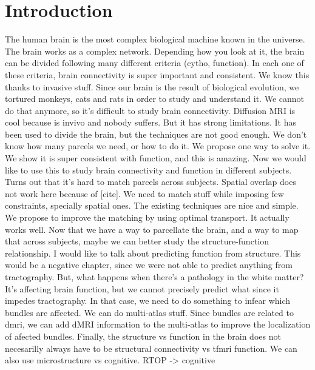 \chapter{Introduction}

The human brain is the most complex biological machine known in the universe.
The brain works as a complex network.
Depending how you look at it, the brain can be divided following many different criteria (cytho, function).
In each one of these criteria, brain connectivity is super important and consistent.
We know this thanks to invasive stuff.
Since our brain is the result of biological evolution, we tortured monkeys, cats and rats in order to study and understand it.
We cannot do that anymore, so it's difficult to study brain connectivity.
Diffusion MRI is cool because is invivo and nobody suffers.
But it has strong limitations.
It has been used to divide the brain, but the techniques are not good enough.
We don't know how many parcels we need, or how to do it.
We propose one way to solve it.
We show it is super consistent with function, and this is amazing.
Now we would like to use this to study brain connectivity and function in different subjects.
Turns out that it's hard to match parcels across subjects.
Spatial overlap does not work here because of [cite].
We need to match stuff while imposing few constraints, specially spatial ones.
The existing techniques are nice and simple.
We propose to improve the matching by using optimal transport.
It actually works well.
Now that we have a way to parcellate the brain, and a way to map that across subjects, maybe we can better study the structure-function relationship.
I would like to talk about predicting function from structure.
This would be a negative chapter, since we were not able to predict anything from tractography.
But, what happens when there's a pathology in the white matter?
It's affecting brain function, but we cannot precisely predict what since it impedes tractography.
In that case, we need to do something to infear which bundles are affected.
We can do multi-atlas stuff.
Since bundles are related to dmri, we can add dMRI information to the multi-atlas to improve the localization of afected bundles.
Finally, the structure vs function in the brain does not necesarilly always have to be structural connectivity vs tfmri function.
We can also use microstructure vs cognitive.
RTOP -> cognitive

